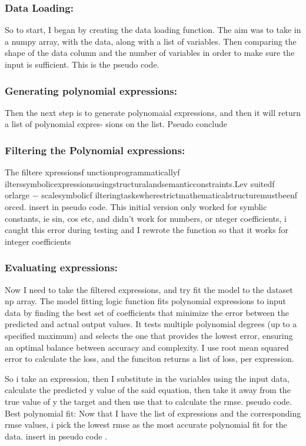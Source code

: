 \documentclass{article}
\begin{document}
\subsubsection{Data Loading:}
So to start, I began by creating the data loading function. The aim was to take in a numpy array, with the data,
along with a list of variables. Then comparing the shape of the data column and the number of variables in order
to make sure the input is sufficient.
This is the pseudo code. 


\subsubsection{Generating polynomial expressions:}

Then the next step is to generate polynomaial expressions, and then it will return a list of polynomial expres-
sions on the list.
Pseudo conclude


\subsubsection{Filtering the Polynomial expressions:}


The filtere xpressionsf unctionprogrammaticallyf ilterssymbolicexpressionsusingstructuralandsemanticconstraints.Lev
suitedf orlarge − scalesymbolicf ilteringtaskswherestrictmathematicalstructuremustbeenf orced.
insert in pseudo code.
This initial version only worked for symblic constants, ie sin, cos etc, and didn’t work for numbers, or nteger
coefficients, i caught this error during testing and I rewrote the function so that it works for integer coefficients


\subsubsection{Evaluating expressions:}

Now I need to take the filtered expressions, and try fit the model to the dataset np array. The model fitting
logic function fits polynomial expressions to input data by finding the best set of coefficients that minimize the
error between the predicted and actual output values. It tests multiple polynomial degrees (up to a specified
maximum) and selects the one that provides the lowest error, ensuring an optimal balance between accuracy
and complexity.
I use root mean squared error to calculate the loss, and the funciton returns a list of loss, per expression. 

So i take an expression, then I substitute in the variables using the input data, calculate the predicted y value of
the said equation, then take it away from the true value of y the target and then use that to calculate the rmse.
pseudo code.
Best polynomial fit:
Now that I have the list of expressions and the corresponding rmse values, i pick the lowest rmse as the most
accurate polynomial fit for the data.
insert in pseudo code . 
\end{document}
